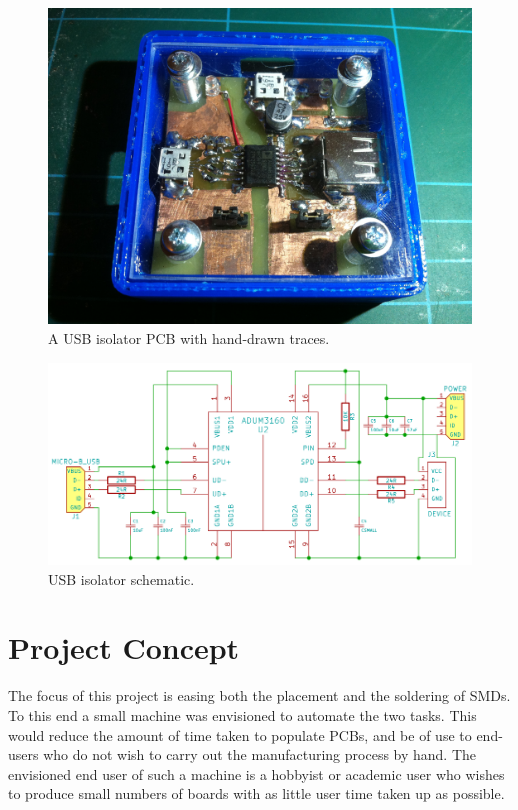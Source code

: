 \begin{figure}[ht!]
\centering
\includegraphics[width=120mm]{resources/usbisolator.jpg}
\caption{A USB isolator PCB with hand-drawn traces.}
\label{usbisolator}
\end{figure}

\begin{figure}[ht!]
\centering
\includegraphics[width=120mm]{resources/isolatorschem.png}
\caption{USB isolator schematic.}
\label{usbisolatorschem}
\end{figure}

\section{Project Concept}
The focus of this project is easing both the placement and the soldering
of SMDs. To this end a small machine was envisioned to automate the two
tasks. This would reduce the amount of time taken to populate PCBs, and
be of use to end-users who do not wish to carry out the manufacturing
process by hand. The envisioned end user of such a machine is a
hobbyist or academic user who wishes to produce small numbers of boards
with as little user time taken up as possible.


